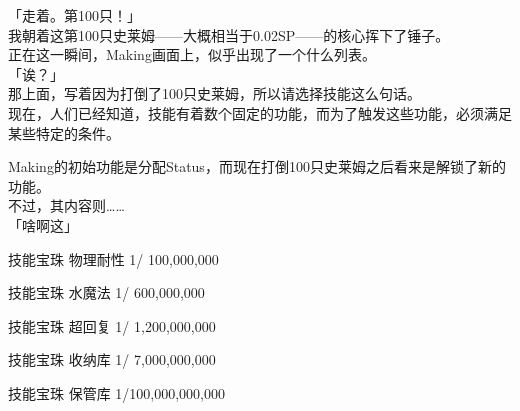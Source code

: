 「走着。第100只！」\\

我朝着这第100只史莱姆——大概相当于0.02SP——的核心挥下了锤子。\\

正在这一瞬间，Making画面上，似乎出现了一个什么列表。\\

「诶？」\\

那上面，写着因为打倒了100只史莱姆，所以请选择技能这么句话。\\

现在，人们已经知道，技能有着数个固定的功能，而为了触发这些功能，必须满足某些特定的条件。

Making的初始功能是分配Status，而现在打倒100只史莱姆之后看来是解锁了新的功能。\\

不过，其内容则……\\

「啥啊这」\\

\cardline

  技能宝珠  物理耐性 1/    100,000,000

  技能宝珠    水魔法 1/    600,000,000

  技能宝珠    超回复 1/  1,200,000,000

  技能宝珠    收纳库 1/  7,000,000,000

  技能宝珠    保管库 1/100,000,000,000

